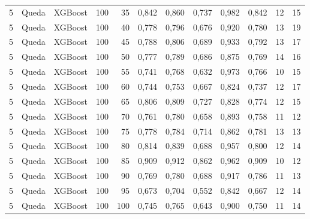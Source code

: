 \begin{longtable}{ccclrrrrrrrr}
5 & Queda & XGBoost & 100 & 35 & 0,842 & 0,860 & 0,737 & 0,982 & 0,842 & 12 & 15 \\
5 & Queda & XGBoost & 100 & 40 & 0,778 & 0,796 & 0,676 & 0,920 & 0,780 & 13 & 19 \\
5 & Queda & XGBoost & 100 & 45 & 0,788 & 0,806 & 0,689 & 0,933 & 0,792 & 13 & 17 \\
5 & Queda & XGBoost & 100 & 50 & 0,777 & 0,789 & 0,686 & 0,875 & 0,769 & 14 & 16 \\
5 & Queda & XGBoost & 100 & 55 & 0,741 & 0,768 & 0,632 & 0,973 & 0,766 & 10 & 15 \\
5 & Queda & XGBoost & 100 & 60 & 0,744 & 0,753 & 0,667 & 0,824 & 0,737 & 12 & 17 \\
5 & Queda & XGBoost & 100 & 65 & 0,806 & 0,809 & 0,727 & 0,828 & 0,774 & 12 & 15 \\
5 & Queda & XGBoost & 100 & 70 & 0,761 & 0,780 & 0,658 & 0,893 & 0,758 & 11 & 12 \\
5 & Queda & XGBoost & 100 & 75 & 0,778 & 0,784 & 0,714 & 0,862 & 0,781 & 13 & 13 \\
5 & Queda & XGBoost & 100 & 80 & 0,814 & 0,839 & 0,688 & 0,957 & 0,800 & 12 & 14 \\
5 & Queda & XGBoost & 100 & 85 & 0,909 & 0,912 & 0,862 & 0,962 & 0,909 & 10 & 12 \\
5 & Queda & XGBoost & 100 & 90 & 0,769 & 0,780 & 0,688 & 0,917 & 0,786 & 11 & 13 \\
5 & Queda & XGBoost & 100 & 95 & 0,673 & 0,704 & 0,552 & 0,842 & 0,667 & 12 & 14 \\
5 & Queda & XGBoost & 100 & 100 & 0,745 & 0,765 & 0,643 & 0,900 & 0,750 & 11 & 14 \\
\end{longtable}
